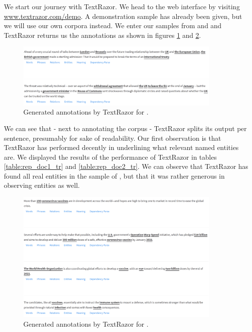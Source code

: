 \documentclass[a4paper, 11pt]{article}
\begin{document}
We start our journey with TextRazor. We head to the web interface by visiting \url{www.textrazor.com/demo}. A demonstration sample has already been given, but we will use our own corpora instead. We enter our samples from \citet{mcgee_2020} and \citet{mckeever_2020} and TextRazor returns us the annotations as shown in figures \ref{fig:doc1tr} and \ref{fig:doc2tr}.

\begin{figure}[H]
	\label{fig:doc1tr}
	\centering
	\includegraphics[width=0.9\textwidth]{doc1_textrazor.png}
	\caption{Generated annotations by TextRazor for \citet{mcgee_2020}.}
\end{figure}

We can see that - next to annotating the corpus - TextRazor splits its output per sentence, presumably for sake of readability. Our first observation is that TextRazor has performed  decently in underlining what relevant named entities are. We displayed the results of the performance of TextRazor in tables \ref{table:rep_doc1_tr} and \ref{table:rep_doc2_tr}. We can observe that TextRazor has found all real entities in the sample of \citet{mcgee_2020}, but that it was rather generous in observing entities as well.

\begin{figure}[H]
	\label{fig:doc2tr}
	\centering
	\includegraphics[width=0.9\textwidth]{doc2_textrazor.png}
	\caption{Generated annotations by TextRazor for \citet{mckeever_2020}.}
\end{figure}
\end{document}
